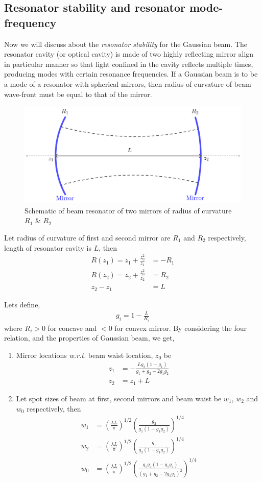 \documentclass[11pt,a4paper]{article}
\numberwithin{equation}{section}
\begin{document}
\subsection{Resonator stability and resonator mode-frequency}
Now we will discuss about the \textit{resonator stability} for the Gaussian beam. The resonator cavity (or optical cavity) is made of two highly reflecting mirror align in particular manner so that  light confined in the cavity reflects multiple times, producing modes with certain resonance frequencies.\cite{opt cavity} If a Gaussian beam is to be a mode of a resonator with spherical mirrors, then radius of curvature of beam wave-front must be equal to that of the mirror.
\begin{figure}[H]
	\centering
	\includegraphics[width=0.6\linewidth]{resonator}
	\caption{Schematic of beam resonator of two mirrors of radius of curvature $R_1$ \& $R_2$}
	\label{fig:resonator}
\end{figure}

Let radius of curvature of first and second mirror are $R_1$ and $R_2$ respectively, length of resonator cavity is $L$, then \cite{milonni}
\begin{align}
	R(z_1)= z_1+\frac{z_0^2}{z_1}&=-R_1\\
	R(z_2)= z_2+\frac{z_0^2}{z_2}&= R_2\\
	z_2-z_1&=L
\end{align}

Lets define, 
\begin{align}
	g_i=1-\frac{L}{R_i}
\end{align}
where $R_i>0$ for concave and $<0$ for convex mirror. By considering the four relation, and the properties of Gaussian beam, we get,\cite{milonni}
\begin{enumerate}
	\item 
	Mirror locations \textit{w.r.t.} beam waist location, $z_0$ be
	\begin{align}
		z_1&=-\frac{Lg_2(1-g_1)}{g_1+g_2-2g_1g_2}\\
		z_2&=z_1+L
	\end{align}

	\item 
	Let spot sizes of beam at first, second mirrors and beam waist be $w_1$, $w_2$ and $w_0$ respectively, then
	\begin{align}
		w_1&= \left(\frac{\lambda L}{\pi}\right)^{1/2} \left(\frac{g_2}{g_1(1-g_1g_2)}\right)^{1/4}\\
		w_2&= \left(\frac{\lambda L}{\pi}\right)^{1/2} \left(\frac{g_1}{g_2(1-g_1g_2)}\right)^{1/4}\\
		w_0&= \left(\frac{\lambda L}{\pi}\right)^{1/2} \left(\frac{g_1g_2(1-g_1g_2)}{(g_1+g_2-2g_1g_2)^2}\right)^{1/4}
	\end{align}
\end{enumerate}
\end{document}
